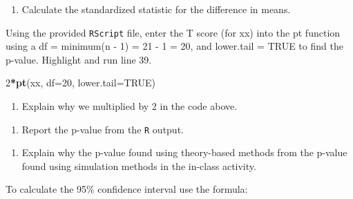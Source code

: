 \documentclass[
]{report}
\newenvironment{Shaded}{\begin{snugshade}}{\end{snugshade}}
\newcommand{\DataTypeTok}[1]{\textcolor[rgb]{0.13,0.29,0.53}{#1}}
\newcommand{\DecValTok}[1]{\textcolor[rgb]{0.00,0.00,0.81}{#1}}
\newcommand{\KeywordTok}[1]{\textcolor[rgb]{0.13,0.29,0.53}{\textbf{#1}}}
\newcommand{\NormalTok}[1]{#1}
\newcommand{\OperatorTok}[1]{\textcolor[rgb]{0.81,0.36,0.00}{\textbf{#1}}}
\newcommand{\OtherTok}[1]{\textcolor[rgb]{0.56,0.35,0.01}{#1}}
\providecommand{\tightlist}{%
  \setlength{\itemsep}{0pt}\setlength{\parskip}{0pt}}
\begin{document}
\vspace{0.5in}

\begin{enumerate}
\def\labelenumi{\arabic{enumi}.}
\setcounter{enumi}{2}
\tightlist
\item
  Calculate the standardized statistic for the difference in means.
\end{enumerate}

\vspace{0.5in}

Using the provided \texttt{RScript} file, enter the T score (for xx) into the pt function using a df = minimum(n - 1) = 21 - 1 = 20, and lower.tail = TRUE to find the p-value. Highlight and run line 39.

\begin{Shaded}
\begin{Highlighting}[]
\DecValTok{2}\OperatorTok{*}\KeywordTok{pt}\NormalTok{(xx, }\DataTypeTok{df=}\DecValTok{20}\NormalTok{, }\DataTypeTok{lower.tail=}\OtherTok{TRUE}\NormalTok{)}
\end{Highlighting}
\end{Shaded}

\begin{enumerate}
\def\labelenumi{\arabic{enumi}.}
\setcounter{enumi}{3}
\tightlist
\item
  Explain why we multiplied by 2 in the code above.
\end{enumerate}

\vspace{0.3in}

\begin{enumerate}
\def\labelenumi{\arabic{enumi}.}
\setcounter{enumi}{4}
\tightlist
\item
  Report the p-value from the \texttt{R} output.
\end{enumerate}

\vspace{0.3in}

\begin{enumerate}
\def\labelenumi{\arabic{enumi}.}
\setcounter{enumi}{5}
\tightlist
\item
  Explain why the p-value found using theory-based methods from the p-value found using simulation methods in the in-class activity.
\end{enumerate}

\vspace{0.5in}

To calculate the 95\% confidence interval use the formula:
\end{document}
